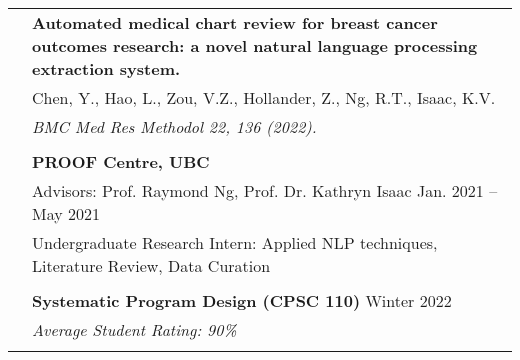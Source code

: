 \documentclass[letterpaper, 11pt]{article}
\begin{document}
\begin{longtable}{p{1.3in}p{4.8in}}
	\nohyphens{\color{Blue}{Publications}}
	 & \textbf{Automated medical chart review for breast cancer outcomes research: a novel natural language processing extraction system.}                                                                    \\
	 & Chen, Y., Hao, L., Zou, V.Z., Hollander, Z., Ng, R.T., Isaac, K.V.                                                                                                                                     \\
	 & \textit{BMC Med Res Methodol 22, 136 (2022).}                                                                                                                                                          \\
	 &                                                                                                                                                                                                        \\

	\nohyphens{\color{Blue}{Research Experience}}
	 & \textbf{PROOF Centre, UBC}                                                                                                                                                                             \\
	 & Advisors: Prof. Raymond Ng, Prof. Dr. Kathryn Isaac \hfill Jan. 2021 -- May 2021                                                                                                                       \\
	 & Undergraduate Research Intern: Applied NLP techniques, Literature Review, Data Curation                                                                                                                \\
	 &                                                                                                                                                                                                        \\

	{\color{Blue}{Teaching Experience}}
	 & \textbf{Systematic Program Design (CPSC 110)} \hfill Winter 2022                                                                                                                                       \\
	 & \textit{Average Student Rating: 90\% }                                                                                                                                                                 \\
	 &                                                                                                                                                                                                        \\


\end{longtable}
\end{document}
